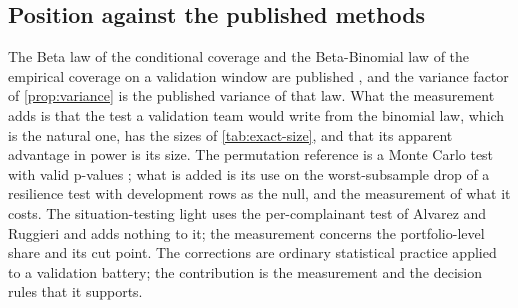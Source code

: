 \subsection{Position against the published methods}

The Beta law of the conditional coverage and the Beta-Binomial law of the empirical coverage on a validation window are published \citep{vovk2012,angelopoulos2021}, and the variance factor of \cref{prop:variance} is the published variance of that law. What the measurement adds is that the test a validation team would write from the binomial law, which is the natural one, has the sizes of \cref{tab:exact-size}, and that its apparent advantage in power is its size. The permutation reference is a Monte Carlo test with valid p-values \citep{phipson2010,davison1997}; what is added is its use on the worst-subsample drop of a resilience test \citep{sudjianto2023} with development rows as the null, and the measurement of what it costs. The situation-testing light uses the per-complainant test of Alvarez and Ruggieri \citep{alvarez2025} and adds nothing to it; the measurement concerns the portfolio-level share and its cut point. The corrections are ordinary statistical practice applied to a validation battery; the contribution is the measurement and the decision rules that it supports.
